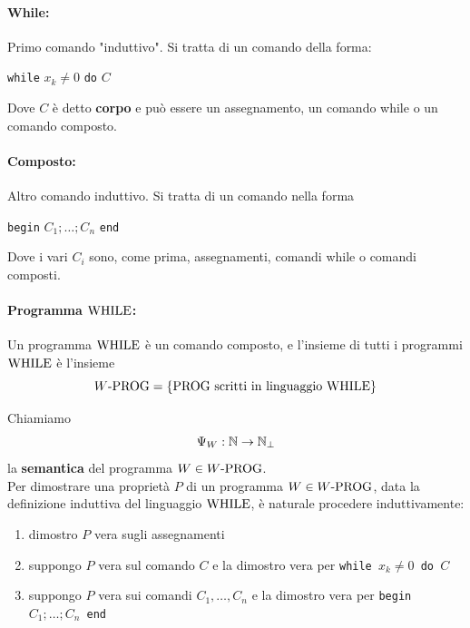 \paragraph{While:} Primo comando "induttivo". Si tratta di un comando della forma: 
\begin{center}
	\texttt{while} $x_k \neq 0$ \texttt{do} $C$
\end{center}
Dove $C$ è detto \textbf{corpo} e può essere un assegnamento, un comando while o un comando composto.

\paragraph{Composto:} Altro comando induttivo. Si tratta di un comando nella forma
\begin{center}
	\texttt{begin} $C_1; \dots; C_n$ \texttt{end}
\end{center}
Dove i vari $C_i$ sono, come prima, assegnamenti, comandi while o comandi composti.\\

\paragraph{Programma $\text{WHILE}$:} Un programma $\text{WHILE}$ è un comando composto, e l'insieme di tutti i programmi $\text{WHILE}$ è l'insieme
$$ W\text{-PROG} = \{\text{PROG} \text{ scritti in linguaggio } \text{WHILE} \} $$

Chiamiamo 
$$ \Psi_W : \mathbb{N} \rightarrow \mathbb{N}_\bot $$
la \textbf{semantica} del programma $W \in W\text{-PROG}$.\\

Per dimostrare una proprietà $P$ di un programma $W \in W\text{-PROG}$, data la definizione induttiva del linguaggio $\text{WHILE}$, è naturale procedere induttivamente: 
\begin{enumerate}
	\item dimostro $P$ vera sugli assegnamenti 
	\item suppongo $P$ vera sul comando $C$ e la dimostro vera per \texttt{while $x_k \neq 0$ do $C$}
	\item suppongo $P$ vera sui comandi $C_1, \dots, C_n$ e la dimostro vera per \texttt{begin $C_1; \dots; C_n$ end}
\end{enumerate}

